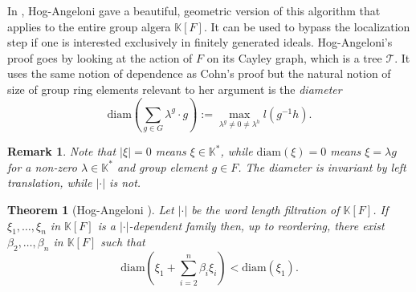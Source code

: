 \documentclass[11pt,letterpaper]{amsart}
\newtheorem{theorem}{Theorem}
\newtheorem{proposition}[theorem]{Proposition}
\newtheorem*{remark}{Remark}
\begin{document}
In \cite{hogangeloni}, Hog-Angeloni gave a beautiful, geometric version of this algorithm that applies to the entire group algera $\mathbb K[F]$. It can be used to bypass the localization step if one is interested exclusively in finitely generated ideals. Hog-Angeloni's proof goes by looking at the action of $F$ on its Cayley graph, which is a tree $\mathcal T$. It uses the same notion of dependence as Cohn's proof %
but the natural notion of size of group ring elements relevant to her argument is the {\it diameter} 
$$
\mathrm{diam}\left(\sum_{g\in G}\lambda^g\cdot g\right):=\max_{\lambda^g\not=0\not=\lambda^h}l(g^{-1}h). 
$$
\begin{remark}
Note that $|\xi|=0$ means $\xi \in\mathbb{K}^*$, while $\mathrm{diam} (\xi) = 0$ means $\xi=\lambda g$ for a non-zero $\lambda\in \mathbb{K}^*$ and group element $g \in F$. The diameter is invariant by left translation, while $|\cdot|$ is not. 
\end{remark}



\begin{theorem}[Hog-Angeloni \cite{hogangeloni}] 
Let $|\cdot|$ be the word length filtration of $\mathbb K[F]$. 
If $\xi_1,\dots,\xi_n$ in $\mathbb K[F]$ is a $|\cdot|$-dependent family then, up to reordering, there exist $\beta_2,\dots,\beta_n$ in $\mathbb K[F]$ such that
$$
\mathrm{diam}\left(\xi_1+\sum_{i=2}^n\beta_i\xi_i\right)<\mathrm{diam}(\xi_1).
$$
\end{theorem}
\end{document}
